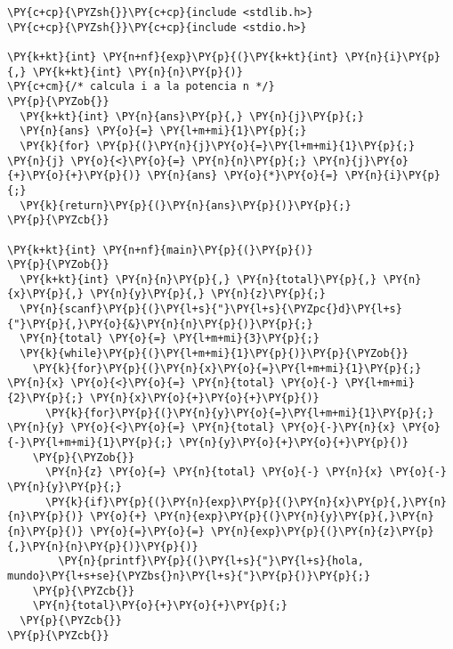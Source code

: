 \begin{Verbatim}[commandchars=\\\{\}]
\PY{c+cp}{\PYZsh{}}\PY{c+cp}{include <stdlib.h>}
\PY{c+cp}{\PYZsh{}}\PY{c+cp}{include <stdio.h>}

\PY{k+kt}{int} \PY{n+nf}{exp}\PY{p}{(}\PY{k+kt}{int} \PY{n}{i}\PY{p}{,} \PY{k+kt}{int} \PY{n}{n}\PY{p}{)}
\PY{c+cm}{/* calcula i a la potencia n */}
\PY{p}{\PYZob{}}
  \PY{k+kt}{int} \PY{n}{ans}\PY{p}{,} \PY{n}{j}\PY{p}{;}
  \PY{n}{ans} \PY{o}{=} \PY{l+m+mi}{1}\PY{p}{;}
  \PY{k}{for} \PY{p}{(}\PY{n}{j}\PY{o}{=}\PY{l+m+mi}{1}\PY{p}{;} \PY{n}{j} \PY{o}{<}\PY{o}{=} \PY{n}{n}\PY{p}{;} \PY{n}{j}\PY{o}{+}\PY{o}{+}\PY{p}{)} \PY{n}{ans} \PY{o}{*}\PY{o}{=} \PY{n}{i}\PY{p}{;}
  \PY{k}{return}\PY{p}{(}\PY{n}{ans}\PY{p}{)}\PY{p}{;}
\PY{p}{\PYZcb{}}

\PY{k+kt}{int} \PY{n+nf}{main}\PY{p}{(}\PY{p}{)}
\PY{p}{\PYZob{}}
  \PY{k+kt}{int} \PY{n}{n}\PY{p}{,} \PY{n}{total}\PY{p}{,} \PY{n}{x}\PY{p}{,} \PY{n}{y}\PY{p}{,} \PY{n}{z}\PY{p}{;}
  \PY{n}{scanf}\PY{p}{(}\PY{l+s}{"}\PY{l+s}{\PYZpc{}d}\PY{l+s}{"}\PY{p}{,}\PY{o}{&}\PY{n}{n}\PY{p}{)}\PY{p}{;}
  \PY{n}{total} \PY{o}{=} \PY{l+m+mi}{3}\PY{p}{;}
  \PY{k}{while}\PY{p}{(}\PY{l+m+mi}{1}\PY{p}{)}\PY{p}{\PYZob{}}
    \PY{k}{for}\PY{p}{(}\PY{n}{x}\PY{o}{=}\PY{l+m+mi}{1}\PY{p}{;} \PY{n}{x} \PY{o}{<}\PY{o}{=} \PY{n}{total} \PY{o}{-} \PY{l+m+mi}{2}\PY{p}{;} \PY{n}{x}\PY{o}{+}\PY{o}{+}\PY{p}{)}
      \PY{k}{for}\PY{p}{(}\PY{n}{y}\PY{o}{=}\PY{l+m+mi}{1}\PY{p}{;} \PY{n}{y} \PY{o}{<}\PY{o}{=} \PY{n}{total} \PY{o}{-}\PY{n}{x} \PY{o}{-}\PY{l+m+mi}{1}\PY{p}{;} \PY{n}{y}\PY{o}{+}\PY{o}{+}\PY{p}{)}
	\PY{p}{\PYZob{}}
	  \PY{n}{z} \PY{o}{=} \PY{n}{total} \PY{o}{-} \PY{n}{x} \PY{o}{-} \PY{n}{y}\PY{p}{;}
	  \PY{k}{if}\PY{p}{(}\PY{n}{exp}\PY{p}{(}\PY{n}{x}\PY{p}{,}\PY{n}{n}\PY{p}{)} \PY{o}{+} \PY{n}{exp}\PY{p}{(}\PY{n}{y}\PY{p}{,}\PY{n}{n}\PY{p}{)} \PY{o}{=}\PY{o}{=} \PY{n}{exp}\PY{p}{(}\PY{n}{z}\PY{p}{,}\PY{n}{n}\PY{p}{)}\PY{p}{)}
	    \PY{n}{printf}\PY{p}{(}\PY{l+s}{"}\PY{l+s}{hola, mundo}\PY{l+s+se}{\PYZbs{}n}\PY{l+s}{"}\PY{p}{)}\PY{p}{;}
	\PY{p}{\PYZcb{}}
    \PY{n}{total}\PY{o}{+}\PY{o}{+}\PY{p}{;}
  \PY{p}{\PYZcb{}}
\PY{p}{\PYZcb{}}
\end{Verbatim}
